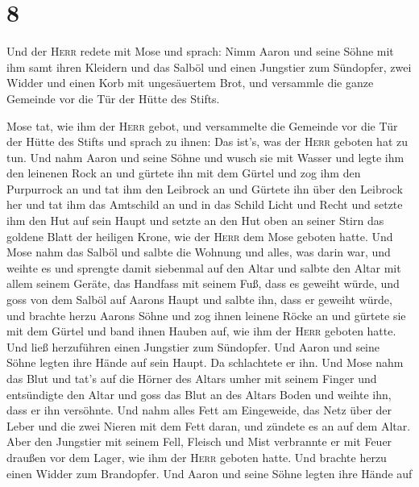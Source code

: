 \hypertarget{section-7}{%
\section{8}\label{section-7}}

 Und der \textsc{Herr} redete mit Mose und sprach:
 Nimm Aaron und seine Söhne mit ihm samt ihren Kleidern
und das Salböl und einen Jungstier zum Sündopfer, zwei Widder und einen
Korb mit ungesäuertem Brot,  und versammle die ganze
Gemeinde vor die Tür der Hütte des Stifts.

 Mose tat, wie ihm der \textsc{Herr} gebot, und
versammelte die Gemeinde vor die Tür der Hütte des Stifts 
und sprach zu ihnen: Das ist's, was der \textsc{Herr} geboten hat zu
tun.  Und nahm Aaron und seine Söhne und wusch sie mit
Wasser  und legte ihm den leinenen Rock an und gürtete ihn
mit dem Gürtel und zog ihm den Purpurrock an und tat ihm den Leibrock an
und Gürtete ihn über den Leibrock her  und tat ihm das
Amtschild an und in das Schild Licht und Recht  und setzte
ihm den Hut auf sein Haupt und setzte an den Hut oben an seiner Stirn
das goldene Blatt der heiligen Krone, wie der \textsc{Herr} dem Mose
geboten hatte.  Und Mose nahm das Salböl und salbte die
Wohnung und alles, was darin war, und weihte es  und
sprengte damit siebenmal auf den Altar und salbte den Altar mit allem
seinem Geräte, das Handfass mit seinem Fuß, dass es geweiht würde,
 und goss von dem Salböl auf Aarons Haupt und salbte ihn,
dass er geweiht würde,  und brachte herzu Aarons Söhne
und zog ihnen leinene Röcke an und gürtete sie mit dem Gürtel und band
ihnen Hauben auf, wie ihm der \textsc{Herr} geboten hatte.
 Und ließ herzuführen einen Jungstier zum Sündopfer. Und
Aaron und seine Söhne legten ihre Hände auf sein Haupt. 
Da schlachtete er ihn. Und Mose nahm das Blut und tat's auf die Hörner
des Altars umher mit seinem Finger und entsündigte den Altar und goss
das Blut an des Altars Boden und weihte ihn, dass er ihn versöhnte.
 Und nahm alles Fett am Eingeweide, das Netz über der
Leber und die zwei Nieren mit dem Fett daran, und zündete es an auf dem
Altar.  Aber den Jungstier mit seinem Fell, Fleisch und
Mist verbrannte er mit Feuer draußen vor dem Lager, wie ihm der
\textsc{Herr} geboten hatte.  Und brachte herzu einen
Widder zum Brandopfer. Und Aaron und seine Söhne legten ihre Hände auf
